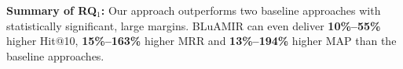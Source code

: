 \documentclass[sigconf,review,anonymous]{acmart}
\begin{document}
\begin{framed}
	\noindent
	\textbf{Summary of RQ$_1$:} Our approach outperforms two baseline approaches \cite{vector-space-model,MarcusLSI} with statistically significant, large margins. BLuAMIR can even deliver \textbf{10\%--55\%} higher Hit@10, \textbf{15\%--163\%} higher MRR and \textbf{13\%--194\%} higher MAP than the baseline approaches.  
\end{framed}
%
\end{document}
